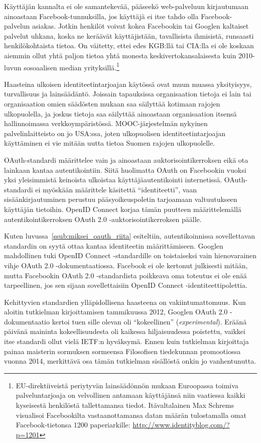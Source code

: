 \documentclass[finnish,gradu]{tktltiki}
\begin{document}
   Käyttäjän kannalta ei ole samantekevää, pääseekö web-palveluun kirjautumaan ainoastaan Facebook-tunnuksilla, jos käyttäjä ei itse tahdo olla Facebook-palvelun asiakas. Jotkin henkilöt voivat kokea Facebookin tai Googlen kaltaiset palvelut uhkana, koska ne keräävät käyttäjistään, tavallisista ihmisistä, runsaasti henkilökohtaista tietoa. On väitetty, ettei edes KGB:llä tai CIA:lla ei ole koskaan aiemmin ollut yhtä paljon tietoa yhtä monesta keskivertokansalaisesta kuin 2010-luvun sosoaalisen median yrityksillä.\footnote{
   EU-direktiiveistä periytyvän lainsäädönnön mukaan Euroopassa toimiva palveluntarjoaja on velvollinen antamaan käyttäjänsä niin vaatiessa kaikki kyseisestä henkilöstä tallettamansa tiedot. Itävaltalainen Max Schrems visualisoi Facebookilta vastaanottamansa datan määrän tulostamalla omat Facebook-tietonsa 1200 paperiarkille: \url{http://www.identityblog.com/?p=1201}
   }

  Haasteina ulkoisen identiteetintarjoajan käytössä ovat muun muassa yksityisyys, turvallisuus ja lainsäädäntö. Joissain tapauksissa organisaation tietoja ei lain tai organisaation omien säädösten mukaan saa säilyttää kotimaan rajojen ulkopuolella, ja joskus tietoja saa säilyttää ainoastaan organisaation itsensä hallinnoimassa verkkoympäristössä. MOOC-järjestelmän nykyinen palvelinlaitteisto on jo USA:ssa, joten ulkopuolisen identiteetintarjoajan käyttäminen ei vie mitään uutta tietoa Suomen rajojen ulkopuolelle.

  OAuth-standardi määrittelee vain ja ainoastaan auktorisointikerroksen eikä ota lainkaan kantaa autentikointiin. Siitä huolimatta OAuth on Facebookin vuoksi yksi yleisimmistä keinoista ulkoistaa käyttäjäautentikointi internetissä. OAuth-standardi ei myöskään määrittele käsitettä ``identiteetti'', vaan sisäänkirjautuminen perustuu pääsyoikeuspoletin tarjoamaan valtuutukseen käyttäjän tietoihin. OpenID Connect korjaa tämän puutteen määrittelemällä autentikointikerroksen OAuth 2.0 -auktorisointikerroksen päälle.

  Kuten luvussa~\ref{ssub:miksei_oauth_riita} esiteltiin, autentikoinnissa sovellettavan standardin on syytä ottaa kantaa identiteetin määrittämiseen. Googlen mahdollinen tuki OpenID Connect -standardille on toistaiseksi vain hienovarainen vihje OAuth 2.0 -dokumentaatiossa. Facebook ei ole kertonut julkisesti mitään, mutta Facebookin OAuth 2.0 -standardista poikkeava oma toteutus ei ole enää tarpeellinen, jos sen sijaan sovellettaisiin OpenID Connect -identiteettipolettia.

  Kehittyvien standardien ylläpidollisena haasteena on vakiintumattomuus. Kun aloitin tutkielman kirjoittamisen tammikuussa 2012, Googlen OAuth 2.0 -dokumentaatio kertoi tuen sille olevan oli ``kokeellinen'' (\emph{experimental}). Eräänä päivänä maininta kokeellisuudesta oli kaikessa hiljaisuudessa poistettu, vaikkei itse standardi ollut vielä IETF:n hyväksymä. %
  Ennen kuin tutkielman kirjoittaja painaa maisterin sormuksen sormeensa Filosofisen tiedekunnan promootiossa vuonna 2014, merkittävä osa tämän tutkielman sisällöstä onkin jo vanhentunutta.





\newpage




\lastpage
\end{document}
